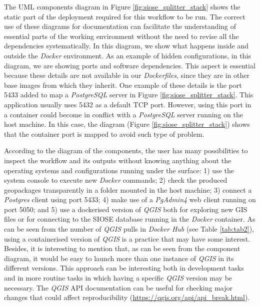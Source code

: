 \documentclass[ijgi,article,submit,moreauthors,pdftex]{Definitions/mdpi}
\begin{document}
The UML components diagram in Figure \ref{fig:siose_splitter_stack} shows the static part of the deployment required for this workflow to be run. The correct use of these diagrams for documentation can facilitate the understanding of essential parts of the working environment without the need to revise all the dependencies systematically. In this diagram, we show what happens inside and outside the \textit{Docker} environment. As an example of hidden configurations, in this diagram, we are showing ports and software dependencies. This aspect is essential because these details are not available in our \textit{Dockerfiles}, since they are in other base images from which they inherit. One example of these details is the port 5433 added to map a \textit{PostgreSQL} server in Figure \ref{fig:siose_splitter_stack}. This application usually uses 5432 as a default TCP port. However, using this port in a container could become in conflict with a \textit{PostgreSQL} server running on the host machine. In this case, the diagram (Figure \ref{fig:siose_splitter_stack}) shows that the container port is mapped to avoid such type of problem.

According to the diagram of the components, the user has many possibilities to inspect the workflow and its outputs without knowing anything about the operating systems and configurations running under the surface: 1) use the system console to execute new \textit{Docker} commands; 2) check the produced geopackages transparently in a folder mounted in the host machine; 3) connect a \textit{Postgres} client using port 5433; 4) make use of a \textit{PgAdmin4} web client running on port 5050; and 5) use a dockerised version of \textit{QGIS} both for exploring new GIS files or for connecting to the SIOSE database running in the \textit{Docker} container. As can be seen from the number of \textit{QGIS} pulls in \textit{Docker Hub} (see Table \ref{tab:tab2}), using a containerised version of \textit{QGIS} is a practice that may have some interest. Besides, it is interesting to mention that, as can be seen from the component diagram, it would be easy to launch more than one instance of \textit{QGIS} in its different versions. This approach can be interesting both in development tasks and in more routine tasks in which having a specific \textit{QGIS} version may be necessary. The \textit{QGIS} API documentation can be useful for checking major changes that could affect reproducibility (\url{https://qgis.org/api/api_break.html}).
\end{document}
